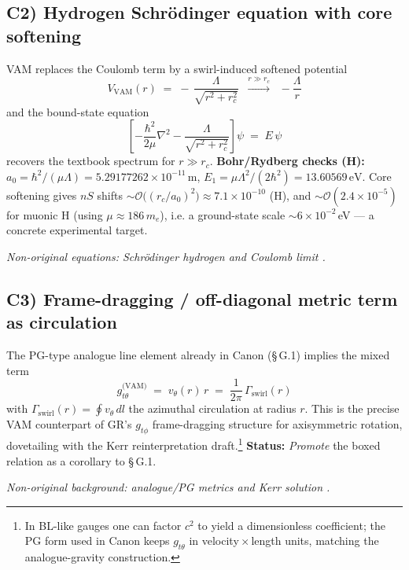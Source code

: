\documentclass[11pt]{article}
\begin{document}
    \subsection*{C2) Hydrogen Schr\"odinger equation with core softening}
    \label{subsec:hydrogen-soft-core}

    VAM replaces the Coulomb term by a swirl-induced softened potential
    \[
        \boxed{ V_{\text{VAM}}(r) \;=\; -\,\frac{\Lambda}{\sqrt{r^2+r_c^2}}
        \;\;\xrightarrow{r\gg r_c}\;\; -\frac{\Lambda}{r} }
    \]
    and the bound-state equation
    \[
        \boxed{ \left[-\frac{\hbar^2}{2\mu}\nabla^2 - \frac{\Lambda}{\sqrt{r^2+r_c^2}}\right]\psi \;=\; E\,\psi }
    \]
    recovers the textbook spectrum for $r\gg r_c$.
    \textbf{Bohr/Rydberg checks (H):}
    $a_0=\hbar^2/(\mu\Lambda)=5.29177262\times10^{-11}\,\mathrm{m}$,
    $E_{1}=\mu\Lambda^2/(2\hbar^2)=13.60569\,\mathrm{eV}$.
    Core softening gives $nS$ shifts $\sim \mathcal{O}\!\big((r_c/a_0)^2\big)\approx 7.1\times10^{-10}$ (H), and
    $\sim \mathcal{O}(2.4\times10^{-5})$ for muonic H (using $\mu\approx 186\,m_e$),
    i.e. a ground-state scale $\sim 6\times10^{-2}$\,eV --- a concrete experimental target.

    \textit{Non-original equations: Schr\"odinger hydrogen and Coulomb limit \cite{Schrodinger1926,Jackson1999}.}

    \subsection*{C3) Frame-dragging / off-diagonal metric term as circulation}
    \label{subsec:metric-circulation}

    The PG-type analogue line element already in Canon (\S\,G.1) implies the mixed term
    \[
        \boxed{ g_{t\theta}^{\text{(VAM)}} \;=\; v_\theta(r)\,r \;=\; \frac{1}{2\pi}\,\Gamma_{\text{swirl}}(r) }
    \]
    with $\Gamma_{\text{swirl}}(r)=\oint v_\theta\,dl$ the azimuthal circulation at radius $r$.
    This is the precise VAM counterpart of GR's $g_{t\phi}$ frame-dragging structure for axisymmetric rotation, dovetailing with the Kerr reinterpretation draft.\footnote{In BL-like gauges one can factor $c^2$ to yield a dimensionless coefficient; the PG form used in Canon keeps $g_{t\theta}$ in velocity\,$\times$\,length units, matching the analogue-gravity construction.}
    \textbf{Status:} \emph{Promote} the boxed relation as a corollary to \S\,G.1.

    \textit{Non-original background: analogue/PG metrics and Kerr solution \cite{Painleve1921,Gullstrand1922,Unruh1981,Visser1998,Kerr1963}.}
\end{document}
